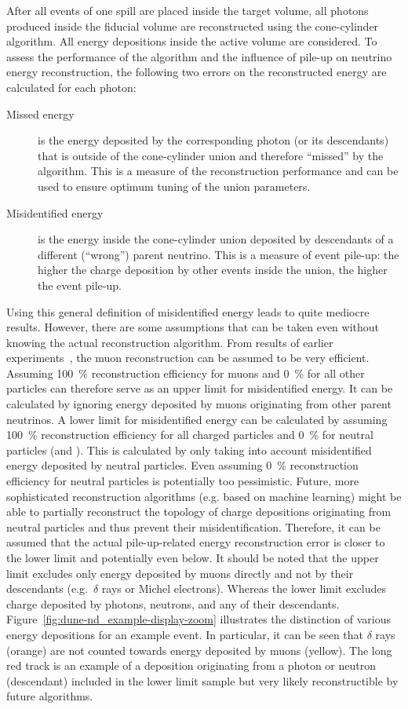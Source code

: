 After all events of one spill are placed inside the target volume, all \Pgpz photons produced inside the fiducial volume are reconstructed using the cone-cylinder algorithm.
All energy depositions inside the active volume are considered.
To assess the performance of the algorithm and the influence of pile-up on neutrino energy reconstruction, the following two errors on the reconstructed energy are calculated for each \Pgpz photon:
\begin{description}
	\item[Missed energy] is the energy deposited by the corresponding \Pgpz photon (or its descendants) that is outside of the cone-cylinder union and therefore ``missed'' by the algorithm.
		This is a measure of the reconstruction performance and can be used to ensure optimum tuning of the union parameters.
	\item[Misidentified energy] is the energy inside the cone-cylinder union deposited by descendants of a different (``wrong'') parent neutrino.
		This is a measure of event pile-up: the higher the charge deposition by other events inside the union, the higher the event pile-up.
\end{description}
Using this general definition of misidentified energy leads to quite mediocre results.
However, there are some assumptions that can be taken even without knowing the actual reconstruction algorithm.
From results of earlier experiments~\cite{pandora}, the muon reconstruction can be assumed to be very efficient.
Assuming \SI{100}{\percent} reconstruction efficiency for muons and \SI{0}{\percent} for all other particles can therefore serve as an upper limit for misidentified energy.
It can be calculated by ignoring energy deposited by muons originating from other parent neutrinos.
A lower limit for misidentified energy can be calculated by assuming \SI{100}{\percent} reconstruction efficiency for all charged particles and \SI{0}{\percent} for neutral particles (\Pgg and \Pn).
This is calculated by only taking into account misidentified energy deposited by neutral particles.
Even assuming \SI{0}{\percent} reconstruction efficiency for neutral particles is potentially too pessimistic.
Future, more sophisticated reconstruction algorithms (e.g. based on machine learning) might be able to partially reconstruct the topology of charge depositions originating from neutral particles and thus prevent their misidentification.
Therefore, it can be assumed that the actual pile-up-related energy reconstruction error is closer to the lower limit and potentially even below.
It should be noted that the upper limit excludes only energy deposited by muons directly and not by their descendants (e.g.\ $\delta$ rays or Michel electrons).
Whereas the lower limit excludes charge deposited by photons, neutrons, and any of their descendants.
Figure~\ref{fig:dune-nd_example-display-zoom} illustrates the distinction of various energy depositions for an example event.
In particular, it can be seen that $\delta$ rays (orange) are not counted towards energy deposited by muons (yellow).
The long red track is an example of a deposition originating from a photon or neutron (descendant) included in the lower limit sample but very likely reconstructible by future algorithms.

